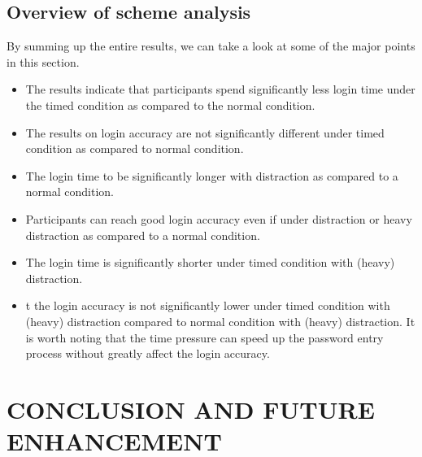 \documentclass[12pt,a4paper,oneside]{report}
\begin{document}
\section{Overview of scheme analysis}
By summing up the entire results, we can take a look at some of the major points in this section.
\begin{itemize}
    \item The results indicate that participants spend significantly less login time under the timed condition as compared to the normal
condition.
    \item  The results on login
accuracy are not significantly different under timed condition
as compared to normal condition.
\item  The login time to be significantly longer with
distraction as compared to a normal condition.
\item Participants can reach good login
accuracy even if under distraction or heavy distraction as
compared to a normal condition.
\item The login time is significantly shorter under timed condition
with (heavy) distraction.
\item t the login accuracy is not significantly lower under timed
condition with (heavy) distraction compared to normal condition with (heavy) distraction. It is worth noting that the time
pressure can speed up the password entry process without
greatly affect the login accuracy.


\end{itemize}





\chapter{CONCLUSION AND FUTURE ENHANCEMENT}
\end{document}
